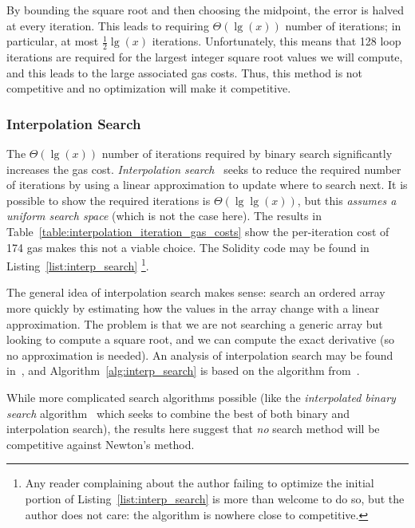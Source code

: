 By bounding the square root and then choosing the midpoint,
the error is halved at every iteration.
This leads to requiring $\Theta(\lg(x))$ number of iterations;
in particular, at most $\frac{1}{2}\lg(x)$ iterations.
Unfortunately, this means that 128 loop iterations are required
for the largest integer square root values we will compute,
and this leads to the large associated gas costs.
Thus, this method is not competitive and
no optimization will make it competitive.




\subsubsection{Interpolation Search}

The $\Theta(\lg(x))$ number of iterations required by binary search
significantly increases the gas cost.
\emph{Interpolation search}~\cite{gonnet1980algorithmic}
seeks to reduce the required number of iterations
by using a linear approximation to update where to search next.
It is possible to show the required iterations is $\Theta(\lg\lg(x))$,
but this \emph{assumes a uniform search space}
(which is not the case here).
The results in Table~\ref{table:interpolation_iteration_gas_costs}
show the per-iteration cost of 174 gas makes this not a viable choice.
The Solidity code may be found in Listing~\ref{list:interp_search}%
\footnote{Any reader complaining about the author failing
to optimize the initial portion of Listing~\ref{list:interp_search}
is more than welcome to do so,
but the author does not care:
the algorithm is nowhere close to competitive.}.

The general idea of interpolation search makes sense:
search an ordered array more quickly
by estimating how the values in the array change with a linear approximation.
The problem is that we are not searching a generic array
but looking to compute a square root,
and we can compute the exact derivative (so no approximation is needed).
An analysis of interpolation search may be found
in~\cite{gonnet1980algorithmic},
and Algorithm~\ref{alg:interp_search} is based on the algorithm
from~\cite[Page 41]{gonnet1980algorithmic}.

While more complicated search algorithms possible
(like the
\emph{interpolated binary search} algorithm~\cite{mohammed2021interpolated}
which seeks to combine the best of both binary and interpolation search),
the results here suggest that \emph{no} search method
will be competitive against Newton's method.

